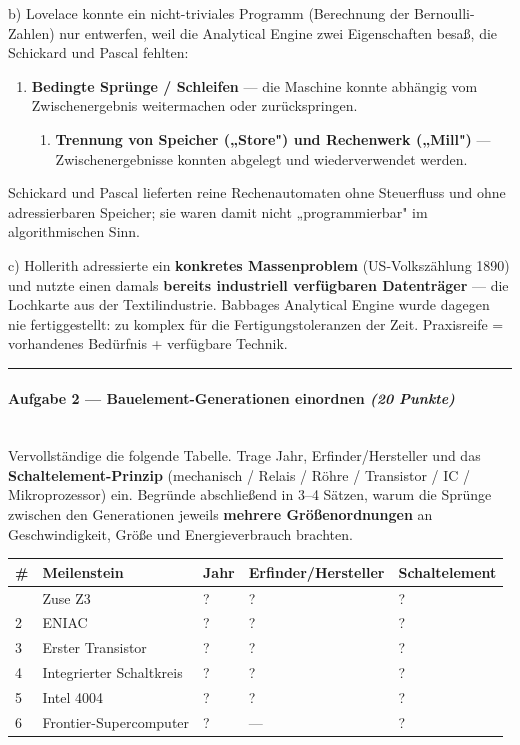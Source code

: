\documentclass[11pt, a4paper]{article}
\begin{document}
b) Lovelace konnte ein nicht-triviales Programm (Berechnung der Bernoulli-Zahlen) nur entwerfen, weil die Analytical Engine zwei Eigenschaften besaß, die Schickard und Pascal fehlten:

\begin{enumerate}
  \item \textbf{Bedingte Sprünge / Schleifen} — die Maschine konnte abhängig vom Zwischenergebnis weitermachen oder zurückspringen.
\begin{enumerate}
  \item \textbf{Trennung von Speicher („Store") und Rechenwerk („Mill")} — Zwischenergebnisse konnten abgelegt und wiederverwendet werden.
\end{enumerate}
\end{enumerate}
Schickard und Pascal lieferten reine Rechenautomaten ohne Steuerfluss und ohne adressierbaren Speicher; sie waren damit nicht „programmierbar" im algorithmischen Sinn.


c) Hollerith adressierte ein \textbf{konkretes Massenproblem} (US-Volkszählung 1890) und nutzte einen damals \textbf{bereits industriell verfügbaren Datenträger} — die Lochkarte aus der Textilindustrie. Babbages Analytical Engine wurde dagegen nie fertiggestellt: zu komplex für die Fertigungstoleranzen der Zeit. Praxisreife = vorhandenes Bedürfnis + verfügbare Technik.



\noindent\textcolor{rulegray}{\rule{\linewidth}{0.4pt}}


\paragraph{Aufgabe 2 — Bauelement-Generationen einordnen \textit{(20 Punkte)}}\mbox{}\\[2pt]

Vervollständige die folgende Tabelle. Trage Jahr, Erfinder/Hersteller und das \textbf{Schaltelement-Prinzip} (mechanisch / Relais / Röhre / Transistor / IC / Mikroprozessor) ein. Begründe abschließend in 3–4 Sätzen, warum die Sprünge zwischen den Generationen jeweils \textbf{mehrere Größenordnungen} an Geschwindigkeit, Größe und Energieverbrauch brachten.



{\small
\begin{tabularx}{\linewidth}{XXXXX}
\hline
\rowcolor{tableheadbg}
{\color{white}\textbf{\#}} & {\color{white}\textbf{Meilenstein}} & {\color{white}\textbf{Jahr}} & {\color{white}\textbf{Erfinder/Hersteller}} & {\color{white}\textbf{Schaltelement}} \\[2pt]
\hline
\endhead
\hline
\endfoot
1 & Zuse Z3 & ? & ? & ? \\
2 & ENIAC & ? & ? & ? \\
3 & Erster Transistor & ? & ? & ? \\
4 & Integrierter Schaltkreis & ? & ? & ? \\
5 & Intel 4004 & ? & ? & ? \\
6 & Frontier-Supercomputer & ? & — & ? \\
\end{tabularx}
}
\end{document}

